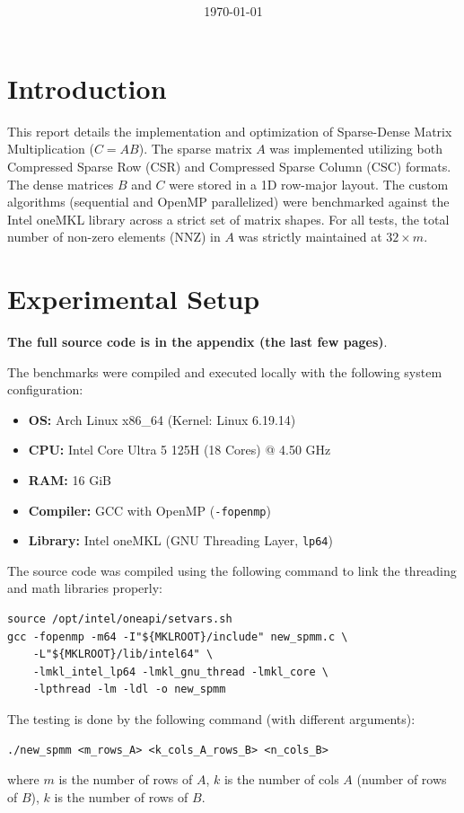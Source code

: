\documentclass[a4paper,11pt]{article}
\title{\textbf{\mytitle}}
\author{\myauthor}
\date{\today}
\begin{document}
\maketitle

\section{Introduction}
This report details the implementation and optimization of Sparse-Dense Matrix Multiplication ($C=AB$). The sparse matrix $A$ was implemented utilizing both Compressed Sparse Row (CSR) and Compressed Sparse Column (CSC) formats. The dense matrices $B$ and $C$ were stored in a 1D row-major layout. The custom algorithms (sequential and OpenMP parallelized) were benchmarked against the Intel oneMKL library across a strict set of matrix shapes. For all tests, the total number of non-zero elements (NNZ) in $A$ was strictly maintained at $32 \times m$.

\section{Experimental Setup}
\textbf{The full source code is in the appendix (the last few pages)}.

The benchmarks were compiled and executed locally with the following system configuration:
\begin{itemize}
    \item \textbf{OS:} Arch Linux x86\_64 (Kernel: Linux 6.19.14)
    \item \textbf{CPU:} Intel Core Ultra 5 125H (18 Cores) @ 4.50 GHz
    \item \textbf{RAM:} 16 GiB
    \item \textbf{Compiler:} GCC with OpenMP (\texttt{-fopenmp})
    \item \textbf{Library:} Intel oneMKL (GNU Threading Layer, \texttt{lp64})
\end{itemize}

The source code was compiled using the following command to link the threading and math libraries properly:
\begin{verbatim}
source /opt/intel/oneapi/setvars.sh
gcc -fopenmp -m64 -I"${MKLROOT}/include" new_spmm.c \
    -L"${MKLROOT}/lib/intel64" \
    -lmkl_intel_lp64 -lmkl_gnu_thread -lmkl_core \
    -lpthread -lm -ldl -o new_spmm
\end{verbatim}

The testing is done by the following command (with different arguments):
\begin{verbatim}
./new_spmm <m_rows_A> <k_cols_A_rows_B> <n_cols_B>
\end{verbatim}
where $m$ is the number of rows of $A$, $k$ is the number of cols $A$ (number of rows of $B$), $k$ is the number of rows of $B$.
\end{document}
